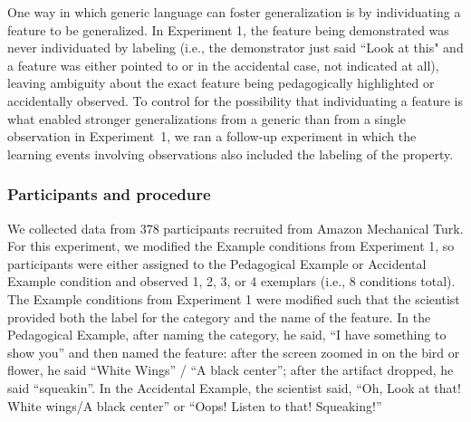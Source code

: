 \documentclass[10pt,letterpaper]{article}
\newcommand{\soph}[1]{\textcolor{Green}{[sb: #1]}}
\begin{document}
One way in which generic language can foster generalization is by individuating a feature to be generalized. 
In Experiment 1, the feature being demonstrated was never individuated by labeling (i.e., the demonstrator just said ``Look at this" and a feature was either pointed to or in the accidental case, not indicated at all), leaving ambiguity about the exact feature being pedagogically highlighted or accidentally observed. 
To control for the possibility that individuating a feature is what enabled stronger generalizations from a generic than from a single observation in Experiment~1, we ran a follow-up experiment in which the learning events involving observations also included the labeling of the property. 

\subsubsection{Participants and procedure}

We collected data from 378 participants recruited from Amazon Mechanical Turk.
For this experiment, we modified the Example conditions from Experiment 1, so participants were either assigned to the Pedagogical Example or Accidental Example condition and observed 1, 2, 3, or 4 exemplars (i.e., 8 conditions total). 
The Example conditions from Experiment 1 were modified such that the scientist provided both the label for the category and the name of the feature. 
In the Pedagogical Example, after naming the category, he said, ``I have something to show you'' and then named the feature: after the screen zoomed in on the bird or flower, he said ``White Wings'' / ``A black center''; after the artifact dropped, he said ``squeakin''.
In the Accidental Example, the scientist said, ``Oh, Look at that! White wings/A black center'' or ``Oops! Listen to that! Squeaking!'' 
\end{document}
